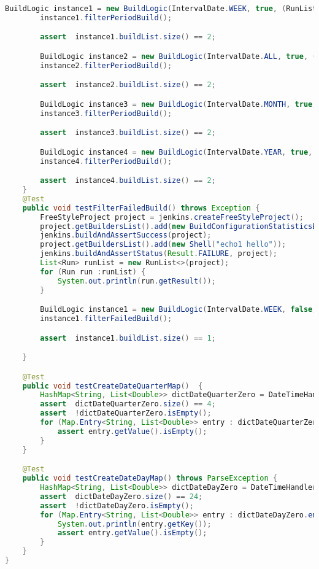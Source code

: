 \begin{lstlisting}[language=Java]
        BuildLogic instance1 = new BuildLogic(IntervalDate.WEEK, true, (RunList<Run>) runList);
        instance1.filterPeriodBuild();

        assert  instance1.buildList.size() == 2;

        BuildLogic instance2 = new BuildLogic(IntervalDate.ALL, true, (RunList<Run>) runList);
        instance2.filterPeriodBuild();

        assert  instance2.buildList.size() == 2;

        BuildLogic instance3 = new BuildLogic(IntervalDate.MONTH, true, (RunList<Run>) runList);
        instance3.filterPeriodBuild();

        assert  instance3.buildList.size() == 2;

        BuildLogic instance4 = new BuildLogic(IntervalDate.YEAR, true, (RunList<Run>) runList);
        instance4.filterPeriodBuild();

        assert  instance4.buildList.size() == 2;
    }
    @Test
    public void testFilterFailedBuild() throws Exception {
        FreeStyleProject project = jenkins.createFreeStyleProject();
        project.getBuildersList().add(new BuildConfigurationStatisticsBuilder());
        jenkins.buildAndAssertSuccess(project);
        project.getBuildersList().add(new Shell("echo1 hello"));
        jenkins.buildAndAssertStatus(Result.FAILURE, project);
        List<Run> runList = new RunList<>(project);
        for (Run run :runList) {
            System.out.println(run.getResult());
        }

        BuildLogic instance1 = new BuildLogic(IntervalDate.WEEK, false, (RunList<Run>) runList);
        instance1.filterFailedBuild();

        assert  instance1.buildList.size() == 1;

    }

    @Test
    public void testCreateDateQuarterMap()  {
        HashMap<String, List<Double>> dictDateQuarterZero = DateTimeHandler.createDateQuarterMap();
        assert  dictDateQuarterZero.size() == 4;
        assert  !dictDateQuarterZero.isEmpty();
        for (Map.Entry<String, List<Double>> entry : dictDateQuarterZero.entrySet()) {
            assert entry.getValue().isEmpty();
        }
    }

    @Test
    public void testCreateDateDayMap() throws ParseException {
        HashMap<String, List<Double>> dictDateDayZero = DateTimeHandler.createDateDayMap();
        assert  dictDateDayZero.size() == 24;
        assert  !dictDateDayZero.isEmpty();
        for (Map.Entry<String, List<Double>> entry : dictDateDayZero.entrySet()) {
            System.out.println(entry.getKey());
            assert entry.getValue().isEmpty();
        }
    }
}


\end{lstlisting}

